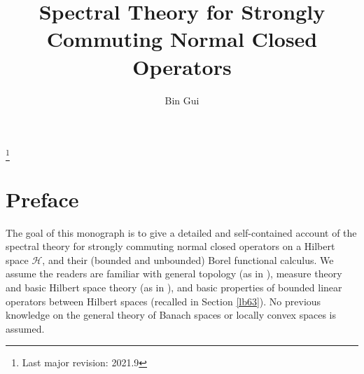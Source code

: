 \documentclass[12pt,a4paper,notitlepage]{article}
\title{Spectral Theory for Strongly Commuting Normal Closed Operators}
\author{{\sc Bin Gui}
}
\date{}
\theoremstyle{definition}
\theoremstyle{plain}
\newcommand{\mc}{\mathcal}
\numberwithin{equation}{section}
\begin{document}
\sloppy %
	
	
	
	\maketitle
	
	
\newcommand\blfootnote[1]{%
	\begingroup
	\renewcommand\thefootnote{}\footnote{#1}%
	\addtocounter{footnote}{-1}%
	\endgroup
}


\tableofcontents

\vspace{-0.5cm}
\blfootnote{Last major revision:  2021.9}



	
	
	
	

	
	

	
	
	
	
	
	
	
	
	

	
\newpage


\section*{Preface}


The goal of this monograph is to give a detailed and self-contained account of the spectral theory for strongly commuting normal closed operators on a Hilbert space $\mc H$, and their (bounded and unbounded) Borel functional calculus. We assume the readers are familiar with general topology (as in \cite{Mun}), measure theory and basic Hilbert space theory (as in \cite{Rud-R}), and basic properties of bounded linear operators between Hilbert spaces (recalled in Section \ref{lb63}). No previous knowledge on the general theory of Banach spaces or locally convex spaces is assumed.
\end{document}
